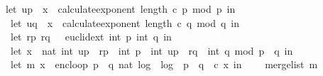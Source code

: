 \begin{isabellebody}
\ \ \ {\isacharparenleft}{\kern0pt}let\ u{\isacharunderscore}{\kern0pt}p\ {\isacharequal}{\kern0pt}\ x\ {\isacharcircum}{\kern0pt}\ {\isacharparenleft}{\kern0pt}calculate{\isacharunderscore}{\kern0pt}exponent\ {\isacharparenleft}{\kern0pt}length\ c{\isacharparenright}{\kern0pt}\ p{\isacharparenright}{\kern0pt}\ mod\ p\ in\isanewline
\ \ \ \ let\ u{\isacharunderscore}{\kern0pt}q\ {\isacharequal}{\kern0pt}\ x\ {\isacharcircum}{\kern0pt}\ {\isacharparenleft}{\kern0pt}calculate{\isacharunderscore}{\kern0pt}exponent\ {\isacharparenleft}{\kern0pt}length\ c{\isacharparenright}{\kern0pt}\ q{\isacharparenright}{\kern0pt}\ mod\ q\ in\isanewline
\ \ \ \ let\ {\isacharparenleft}{\kern0pt}{\isacharparenleft}{\kern0pt}r{\isacharunderscore}{\kern0pt}p{\isacharcomma}{\kern0pt}\ r{\isacharunderscore}{\kern0pt}q{\isacharparenright}{\kern0pt}{\isacharcomma}{\kern0pt}\ {\isacharunderscore}{\kern0pt}{\isacharparenright}{\kern0pt}\ {\isacharequal}{\kern0pt}\ euclid{\isacharunderscore}{\kern0pt}ext\ {\isacharparenleft}{\kern0pt}int\ p{\isacharparenright}{\kern0pt}\ {\isacharparenleft}{\kern0pt}int\ q{\isacharparenright}{\kern0pt}\ in\isanewline
\ \ \ \ let\ x{\isacharunderscore}{\kern0pt}{}\ {\isacharequal}{\kern0pt}\ nat\ {\isacharparenleft}{\kern0pt}{\isacharparenleft}{\kern0pt}int\ u{\isacharunderscore}{\kern0pt}p\ {\isacharasterisk}{\kern0pt}\ r{\isacharunderscore}{\kern0pt}p\ {\isacharasterisk}{\kern0pt}\ int\ p\ {\isacharplus}{\kern0pt}\ int\ u{\isacharunderscore}{\kern0pt}p\ {\isacharasterisk}{\kern0pt}\ r{\isacharunderscore}{\kern0pt}q\ {\isacharasterisk}{\kern0pt}\ int\ q{\isacharparenright}{\kern0pt}\ mod\ {\isacharparenleft}{\kern0pt}p\ {\isacharasterisk}{\kern0pt}\ q{\isacharparenright}{\kern0pt}{\isacharparenright}{\kern0pt}\ in\isanewline
\ \ \ \ let\ {\isacharparenleft}{\kern0pt}m{\isacharcomma}{\kern0pt}\ x{\isacharprime}{\kern0pt}{\isacharparenright}{\kern0pt}\ {\isacharequal}{\kern0pt}\ enc{\isacharunderscore}{\kern0pt}loop\ {\isacharparenleft}{\kern0pt}p\ {\isacharasterisk}{\kern0pt}\ q{\isacharcomma}{\kern0pt}\ {\isacharparenleft}{\kern0pt}nat\ {\isasymlfloor}log\ {}\ {\isacharparenleft}{\kern0pt}log\ {}\ {\isacharparenleft}{\kern0pt}p\ {\isacharasterisk}{\kern0pt}\ q{\isacharparenright}{\kern0pt}{\isacharparenright}{\kern0pt}{\isasymrfloor}{\isacharparenright}{\kern0pt}\ {\isacharcomma}{\kern0pt}\ c{\isacharparenright}{\kern0pt}\ x{\isacharunderscore}{\kern0pt}{}\ in\isanewline
\ \ \ \ merge{\isacharunderscore}{\kern0pt}list\ m{\isacharparenright}{\kern0pt}{\isacharparenright}{\kern0pt}{\isachardoublequoteclose}\isanewline

\end{isabellebody}
